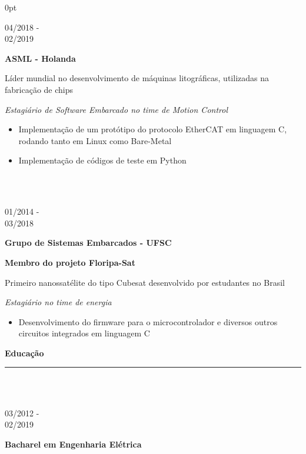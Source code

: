 \documentclass[a4paper]{article}
\begin{document}
\begin{adjustwidth}{\parindent}{0pt}
\begin{minipage}[t]{0.65\textwidth}
\begin{minipage}[t]{0.2\textwidth}
\large{04/2018 - \\ 02/2019}
\end{minipage}
\begin{minipage}[t]{0.8\textwidth}
{
  \setlength{\parskip}{5.5pt}
  \Large{\textbf{ASML - Holanda}}
  
  \large{Líder mundial no desenvolvimento de máquinas litográficas, utilizadas na fabricação de chips}
  
  \large{\textit{Estagiário de Software Embarcado no time de Motion Control}}
  \begin{itemize}
    \item \normalsize{Implementação de um protótipo do protocolo EtherCAT em linguagem C, rodando tanto em Linux como Bare-Metal}
    \item \normalsize{Implementação de códigos de teste em Python}
  \end{itemize}
}
\end{minipage} \\ \\

\begin{minipage}[t]{0.2\textwidth}
  \large{01/2014 - \\ 03/2018}
\end{minipage}
\begin{minipage}[t]{0.8\textwidth}
{
  \setlength{\parskip}{5.5pt}
  \Large{\textbf{Grupo de Sistemas Embarcados - UFSC}}
  
  \large{\textbf{Membro do projeto Floripa-Sat}}
  
  \large{Primeiro nanossatélite do tipo Cubesat desenvolvido por estudantes no Brasil}
  
  \large{\textit{Estagiário no time de energia}}
}
\begin{itemize}
  \item \normalsize{Desenvolvimento do firmware para o microcontrolador e diversos outros circuitos integrados em linguagem C}
\end{itemize}
  
\end{minipage}

\Large{\textbf{Educação}} \normalsize \\ \rule{\textwidth}{0.5pt} \\ \\
\begin{minipage}[t]{0.2\textwidth}
\large{03/2012 - \\ 02/2019}
\end{minipage}
\begin{minipage}[t]{0.8\textwidth}
{
  \setlength{\parskip}{5.5pt}
  \Large{\textbf{Bacharel em Engenharia Elétrica}}
  
}
\end{minipage}
\end{minipage}
\end{adjustwidth}
\end{document}

